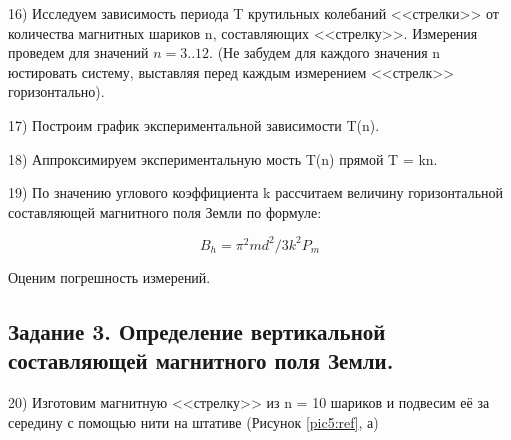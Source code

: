 \documentclass[a4paper,12pt]{article} %
\begin{document}
16) Исследуем зависимость периода T крутильных колебаний <<стрелки>> от количества магнитных шариков n, составляющих <<стрелку>>. Измерения проведем для значений $n = 3..12$. (Не забудем для каждого значения n юстировать систему, выставляя перед каждым измерением <<стрелк>> горизонтально).

17) Построим график экспериментальной зависимости T(n).

18) Аппроксимируем экспериментальную мость T(n) прямой T = kn.

19) По значению углового коэффициента k рассчитаем величину горизонтальной составляющей магнитного поля Земли по формуле:

\begin{equation}\label{6}
B_h = \pi^2md^2 / 3k^2P_m
\end{equation}

Оценим погрешность измерений.

\subsection{Задание 3. Определение вертикальной составляющей магнитного поля Земли.}

20) Изготовим магнитную <<стрелку>> из n = 10 шариков и подвесим её за середину с помощью нити на штативе (Рисунок \eqref{pic5:ref}, а)
\end{document}
